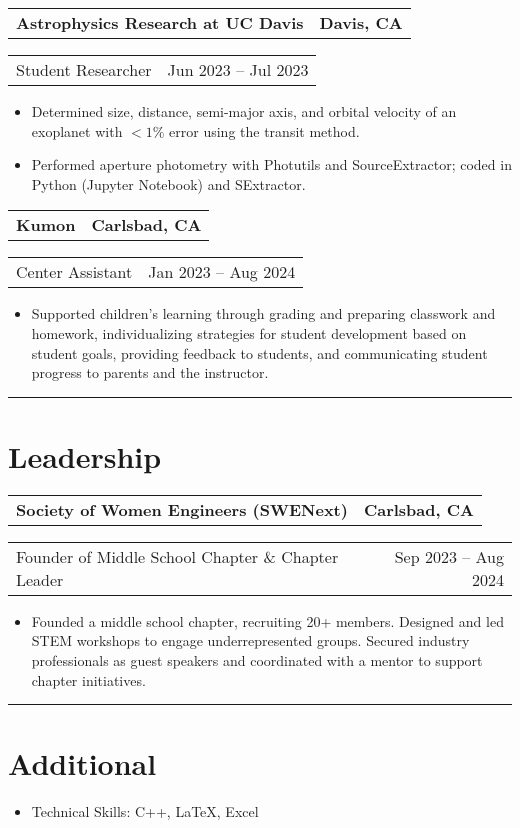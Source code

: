 \documentclass[11pt]{article}
\makeatletter
\newcommand{\entryrow}[2]{%
  \begin{tabular*}{\textwidth}{@{\extracolsep{\fill}} l r}
    #1 & #2 \\
  \end{tabular*}\vspace{-2pt}
}
\makeatother
\begin{document}
\entryrow{\textbf{Astrophysics Research at UC Davis}}{\textbf{Davis, CA}}
\entryrow{Student Researcher}{Jun 2023 -- Jul 2023}
\begin{itemize}
  \item Determined size, distance, semi-major axis, and orbital velocity of an exoplanet with $<\!1\%$ error using the transit method.
  \item Performed aperture photometry with Photutils and SourceExtractor; coded in Python (Jupyter Notebook) and SExtractor.
\end{itemize}

\entryrow{\textbf{Kumon}}{\textbf{Carlsbad, CA}}
\entryrow{Center Assistant}{Jan 2023 -- Aug 2024}
\begin{itemize}
  \item Supported children's learning through grading and preparing classwork and homework, individualizing strategies for student development based on student goals, providing feedback to students, and communicating student progress to parents and the instructor.
\end{itemize}

\vspace{3pt}\hrule\vspace{7pt}

\section*{Leadership}

\entryrow{\textbf{Society of Women Engineers (SWENext)}}{\textbf{Carlsbad, CA}}
\entryrow{Founder of Middle School Chapter \& Chapter Leader}{Sep 2023 -- Aug 2024}
\begin{itemize}
  \item Founded a middle school chapter, recruiting 20+ members. Designed and led STEM workshops to engage underrepresented groups. Secured industry professionals as guest speakers and coordinated with a mentor to support chapter initiatives.
\end{itemize}

\vspace{3pt}\hrule\vspace{7pt}

\section*{Additional}
\begin{itemize}
  \item Technical Skills: C++, \LaTeX{}, Excel
\end{itemize}
\end{document}
